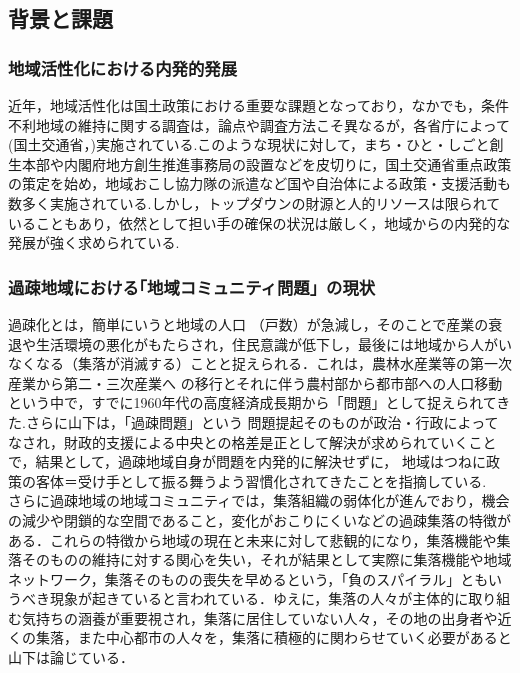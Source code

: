 \documentclass[a4paper]{jsarticle}
\begin{document}
\subsection{背景と課題}
\subsubsection{地域活性化における内発的発展}
近年，地域活性化は国土政策における重要な課題となっており，なかでも，条件不利地域の維持に関する調査は，論点や調査方法こそ異なるが，各省庁によって(国土交通省\cite{1}，)実施されている.このような現状に対して，まち・ひと・しごと創生本部や内閣府地方創生推進事務局の設置などを皮切りに，国土交通省重点政策\cite{2}の策定を始め，地域おこし協力隊の派遣など国や自治体による政策・支援活動も数多く実施されている.しかし，トップダウンの財源と人的リソースは限られていることもあり，依然として担い手の確保の状況は厳しく，地域からの内発的な発展が強く求められている.
\subsubsection{過疎地域における｢地域コミュニティ問題」の現状}
過疎化とは，簡単にいうと地域の人口 （戸数）が急減し，そのことで産業の衰 退や生活環境の悪化がもたらされ，住民意識が低下し，最後には地域から人がいなくなる（集落が消滅する）ことと捉えられる．\cite{3}これは，農林水産業等の第一次産業から第二・三次産業へ の移行とそれに伴う農村部から都市部への人口移動という中で，すでに1960年代の高度経済成長期から「問題」として捉えられてきた.\cite{4}さらに山下は，「過疎問題」という 問題提起そのものが政治・行政によってなされ，財政的支援による中央との格差是正として解決が求められていくことで，結果として，過疎地域自身が問題を内発的に解決せずに， 地域はつねに政策の客体＝受け手として振る舞うよう習慣化されてきたことを指摘している.\cite{5}
　さらに過疎地域の地域コミュニティでは，集落組織の弱体化が進んでおり，機会の減少や閉鎖的な空間であること，変化がおこりにくいなどの過疎集落の特徴がある．これらの特徴から地域の現在と未来に対して悲観的になり，集落機能や集落そのものの維持に対する関心を失い，それが結果として実際に集落機能や地域ネットワーク，集落そのものの喪失を早めるという，「負のスパイラル」ともいうべき現象が起きていると言われている．\cite{6}ゆえに，集落の人々が主体的に取り組む気持ちの涵養が重要視され，集落に居住していない人々，その地の出身者や近くの集落，また中心都市の人々を，集落に積極的に関わらせていく必要があると山下は論じている．\cite{7}
\end{document}
